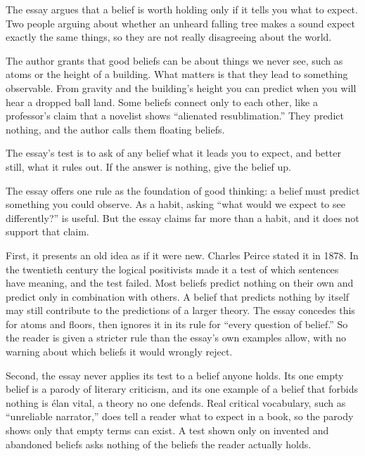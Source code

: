 \begin{afterword}
\summaryhead

The essay argues that a belief is worth holding only if it tells you what to expect. Two people arguing about whether an unheard falling tree makes a sound expect exactly the same things, so they are not really disagreeing about the world.

The author grants that good beliefs can be about things we never see, such as atoms or the height of a building. What matters is that they lead to something observable. From gravity and the building's height you can predict when you will hear a dropped ball land. Some beliefs connect only to each other, like a professor's claim that a novelist shows ``alienated resublimation.'' They predict nothing, and the author calls them floating beliefs.

The essay's test is to ask of any belief what it leads you to expect, and better still, what it rules out. If the answer is nothing, give the belief up.

\responsehead

The essay offers one rule as the foundation of good thinking: a belief must predict something you could observe. As a habit, asking ``what would we expect to see differently?'' is useful. But the essay claims far more than a habit, and it does not support that claim.

First, it presents an old idea as if it were new. Charles Peirce stated it in 1878. In the twentieth century the logical positivists made it a test of which sentences have meaning, and the test failed. Most beliefs predict nothing on their own and predict only in combination with others. A belief that predicts nothing by itself may still contribute to the predictions of a larger theory. The essay concedes this for atoms and floors, then ignores it in its rule for ``every question of belief.'' So the reader is given a stricter rule than the essay's own examples allow, with no warning about which beliefs it would wrongly reject.

Second, the essay never applies its test to a belief anyone holds. Its one empty belief is a parody of literary criticism, and its one example of a belief that forbids nothing is élan vital, a theory no one defends. Real critical vocabulary, such as ``unreliable narrator,'' does tell a reader what to expect in a book, so the parody shows only that empty terms can exist. A test shown only on invented and abandoned beliefs asks nothing of the beliefs the reader actually holds.


\end{afterword}
